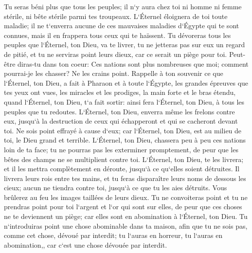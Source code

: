\verse Tu seras béni plus que tous les peuples; il n`y aura chez toi ni homme ni femme stérile, ni bête stérile parmi tes troupeaux. 
\verse L`Éternel éloignera de toi toute maladie; il ne t`enverra aucune de ces mauvaises maladies d`Égypte qui te sont connues, mais il en frappera tous ceux qui te haïssent. 
\verse Tu dévoreras tous les peuples que l`Éternel, ton Dieu, va te livrer, tu ne jetteras pas sur eux un regard de pitié, et tu ne serviras point leurs dieux, car ce serait un piège pour toi. 
\verse Peut-être diras-tu dans ton coeur: Ces nations sont plus nombreuses que moi; comment pourrai-je les chasser? 
\verse Ne les crains point. Rappelle à ton souvenir ce que l`Éternel, ton Dieu, a fait à Pharaon et à toute l`Égypte, 
\verse les grandes épreuves que tes yeux ont vues, les miracles et les prodiges, la main forte et le bras étendu, quand l`Éternel, ton Dieu, t`a fait sortir: ainsi fera l`Éternel, ton Dieu, à tous les peuples que tu redoutes. 
\verse L`Éternel, ton Dieu, enverra même les frelons contre eux, jusqu`à la destruction de ceux qui échapperont et qui se cacheront devant toi. 
\verse Ne sois point effrayé à cause d`eux; car l`Éternel, ton Dieu, est au milieu de toi, le Dieu grand et terrible. 
\verse L`Éternel, ton Dieu, chassera peu à peu ces nations loin de ta face; tu ne pourras pas les exterminer promptement, de peur que les bêtes des champs ne se multiplient contre toi. 
\verse L`Éternel, ton Dieu, te les livrera; et il les mettra complètement en déroute, jusqu`à ce qu`elles soient détruites. 
\verse Il livrera leurs rois entre tes mains, et tu feras disparaître leurs noms de dessous les cieux; aucun ne tiendra contre toi, jusqu`à ce que tu les aies détruits. 
\verse Vous brûlerez au feu les images taillées de leurs dieux. Tu ne convoiteras point et tu ne prendras point pour toi l`argent et l`or qui sont sur elles, de peur que ces choses ne te deviennent un piège; car elles sont en abomination à l`Éternel, ton Dieu. 
\verse Tu n`introduiras point une chose abominable dans ta maison, afin que tu ne sois pas, comme cet chose, dévoué par interdit; tu l`auras en horreur, tu l`auras en abomination,, car c`est une chose dévouée par interdit. 

\chapter{}

